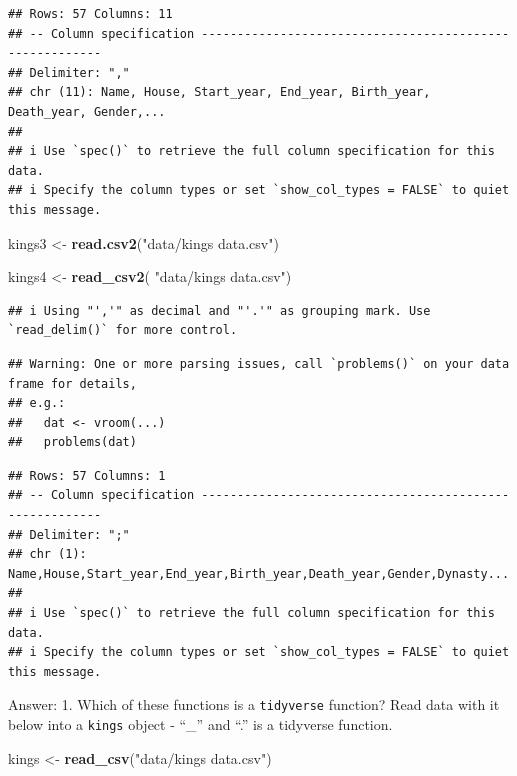 \documentclass[
]{article}
\newenvironment{Shaded}{\begin{snugshade}}{\end{snugshade}}
\newcommand{\FunctionTok}[1]{\textcolor[rgb]{0.13,0.29,0.53}{\textbf{#1}}}
\newcommand{\NormalTok}[1]{#1}
\newcommand{\OtherTok}[1]{\textcolor[rgb]{0.56,0.35,0.01}{#1}}
\newcommand{\StringTok}[1]{\textcolor[rgb]{0.31,0.60,0.02}{#1}}
\begin{document}
\begin{verbatim}
## Rows: 57 Columns: 11
## -- Column specification --------------------------------------------------------
## Delimiter: ","
## chr (11): Name, House, Start_year, End_year, Birth_year, Death_year, Gender,...
## 
## i Use `spec()` to retrieve the full column specification for this data.
## i Specify the column types or set `show_col_types = FALSE` to quiet this message.
\end{verbatim}

\begin{Shaded}
\begin{Highlighting}[]
\NormalTok{kings3 }\OtherTok{\textless{}{-}} \FunctionTok{read.csv2}\NormalTok{(}\StringTok{"data/kings data.csv"}\NormalTok{)}

\NormalTok{kings4 }\OtherTok{\textless{}{-}} \FunctionTok{read\_csv2}\NormalTok{( }\StringTok{"data/kings data.csv"}\NormalTok{)}
\end{Highlighting}
\end{Shaded}

\begin{verbatim}
## i Using "','" as decimal and "'.'" as grouping mark. Use `read_delim()` for more control.
\end{verbatim}

\begin{verbatim}
## Warning: One or more parsing issues, call `problems()` on your data frame for details,
## e.g.:
##   dat <- vroom(...)
##   problems(dat)
\end{verbatim}

\begin{verbatim}
## Rows: 57 Columns: 1
## -- Column specification --------------------------------------------------------
## Delimiter: ";"
## chr (1): Name,House,Start_year,End_year,Birth_year,Death_year,Gender,Dynasty...
## 
## i Use `spec()` to retrieve the full column specification for this data.
## i Specify the column types or set `show_col_types = FALSE` to quiet this message.
\end{verbatim}

Answer: 1. Which of these functions is a \texttt{tidyverse} function?
Read data with it below into a \texttt{kings} object - ``\_'' and ``.''
is a tidyverse function.

\begin{Shaded}
\begin{Highlighting}[]
\NormalTok{kings }\OtherTok{\textless{}{-}} \FunctionTok{read\_csv}\NormalTok{(}\StringTok{"data/kings data.csv"}\NormalTok{)}
\end{Highlighting}
\end{Shaded}
\end{document}
